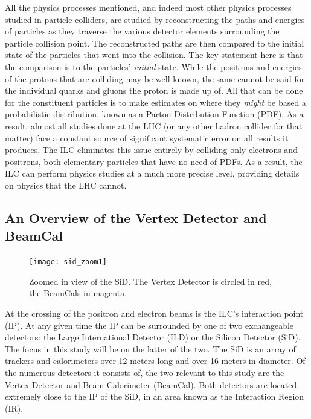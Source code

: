 \documentclass{report}
\begin{document}
                All the physics processes mentioned, and indeed most other physics processes studied in particle colliders, are studied by reconstructing the paths and energies of particles as they traverse the various detector elements surrounding the particle collision point. The reconstructed paths are then compared to the initial state of the particles that went into the collision. The key statement here is that the comparison is to the particles' \textit{initial} state. While the positions and energies of the protons that are colliding may be well known, the same cannot be said for the individual quarks and gluons the proton is made up of. All that can be done for the constituent particles is to make estimates on where they \textit{might} be based a probabilistic distribution, known as a Parton Distribution Function (PDF). As a result, almost all studies done at the LHC (or any other hadron collider for that matter) face a constant source of significant systematic error on all results it produces. The ILC eliminates this issue entirely by colliding only electrons and positrons, both elementary particles that have no need of PDFs. As a result, the ILC can perform physics studies at a much more precise level, providing details on physics that the LHC cannot.

            \subsection{An Overview of the Vertex Detector and BeamCal}
                \begin{figure}[h] 
                    \texttt{[image: sid\_zoom1]}
                    \centering
                    \caption{Zoomed in view of the SiD.
                        The Vertex Detector is circled in red,
                        the BeamCals in magenta.}
                    \label{fig:sid_zoom1}
                \end{figure}

                At the crossing of the positron and electron beams is the ILC's interaction point (IP). At any given time the IP can be surrounded by one of two exchangeable detectors: the Large International Detector (ILD) or the Silicon Detector (SiD). The focus in this study will be on the latter of the two. The SiD is an array of trackers and calorimeters over 12 meters long and over 16 meters in diameter. Of the numerous detectors it consists of, the two relevant to this study are the Vertex Detector and Beam Calorimeter (BeamCal). Both detectors are located extremely close to the IP of the SiD, in an area known as the Interaction Region (IR). 
                
\end{document}
